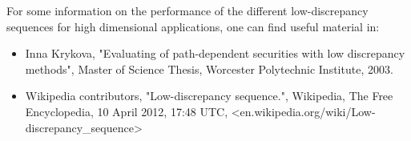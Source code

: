       {
        For some information on the performance of the different low-discrepancy sequences for high dimensional applications, one can find useful material in:
        \begin{itemize}
        \item Inna Krykova, "Evaluating of path-dependent securities with low discrepancy methods", Master of Science Thesis, Worcester Polytechnic Institute, 2003.
        \item \label{wikipedia} Wikipedia contributors, "Low-discrepancy sequence.", Wikipedia, The Free Encyclopedia, 10 April 2012, 17:48 UTC, <en.wikipedia.org/wiki/Low-discrepancy\_sequence>
        \end{itemize}
      }
